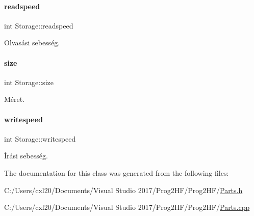 \paragraph{\texorpdfstring{readspeed}{readspeed}}
{\footnotesize\ttfamily int Storage\+::readspeed\hspace{0.3cm}{\ttfamily [protected]}}



Olvasási sebesség. 

\mbox{\label{class_storage_abcc80ce58a21fa884035617ee0b6cb67}} 
\paragraph{\texorpdfstring{size}{size}}
{\footnotesize\ttfamily int Storage\+::size\hspace{0.3cm}{\ttfamily [protected]}}



Méret. 

\mbox{\label{class_storage_a0198a1483ccf849d48c76da88599ba8b}} 
\paragraph{\texorpdfstring{writespeed}{writespeed}}
{\footnotesize\ttfamily int Storage\+::writespeed\hspace{0.3cm}{\ttfamily [protected]}}



Írási sebesség. 



The documentation for this class was generated from the following files\+:\begin{DoxyCompactItemize}
\item 
C\+:/\+Users/cxl20/\+Documents/\+Visual Studio 2017/\+Prog2\+H\+F/\+Prog2\+H\+F/\mbox{\hyperlink{_parts_8h}{Parts.\+h}}\item 
C\+:/\+Users/cxl20/\+Documents/\+Visual Studio 2017/\+Prog2\+H\+F/\+Prog2\+H\+F/\mbox{\hyperlink{_parts_8cpp}{Parts.\+cpp}}\end{DoxyCompactItemize}
